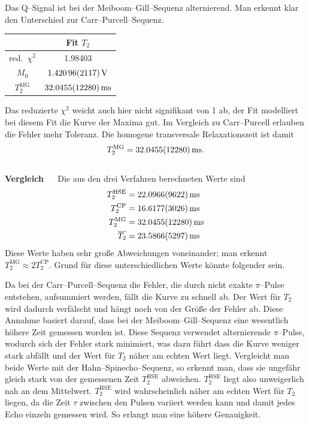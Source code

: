 \documentclass[10pt]{article}
\newenvironment{Figure}
  {\par\medskip\noindent\minipage{\linewidth}}
  {\endminipage\par\medskip}
\begin{document}
\begin{multicols}{2}
Das Q--Signal ist bei der Meiboom--Gill--Sequenz alternierend.
Man erkennt klar den Unterschied zur Carr--Purcell--Sequenz.
  \begin{Figure}
    \centering\resizebox{\textwidth}{!}{}
    \label{fig:mg}
  \end{Figure}
  \begin{center}
    \begin{tabular}{c|c}
    & Fit $T_2$\\
    \hline
    red.\ $\chi ^2$ &  1.98403\\
    $M_0$ & $\SI{1.42096+-0.02117}{V}$ \\
    $T_2^{\text{MG}}$ & $\SI{32.0455+-1.228}{ms}$ 
    \end{tabular}
  \label{Tab:mg_para}
  \end{center}
Das reduzierte $\chi ^2$ weicht auch hier nicht signifikant von 1 ab, der Fit modelliert bei diesem Fit die Kurve der Maxima gut.
Im Vergleich zu Carr--Purcell erlauben die Fehler mehr Toleranz.
Die homogene transversale Relaxationszeit ist damit
\begin{align} 
        T_2^{\text{MG}}=\SI{32.0455+-1.228}{ms}
.\end{align} 
\\\textbf{Vergleich} $\quad$ 
Die aus den drei Verfahren berechneten Werte sind
\begin{align} 
        T_2^{\text{HSE}}&=\SI{22.0966+-0.9622}{ms}\\
        T_2^{\text{CP}}&=\SI{16.6177+-0.3026}{ms}\\
        T_2^{\text{MG}}&=\SI{32.0455+-1.228}{ms}\\
        \overline{T_2}&=\SI{23.5866+-0.5297}{ms}
\end{align} 
Diese Werte haben sehr große Abweichungen voneinander; man erkennt $T_2^{\text{MG}}\approx 2T_2^{\text{CP}}$. Grund für diese unterschiedlichen Werte könnte folgender sein.

Da bei der Carr--Purcell--Sequenz die Fehler, die durch nicht exakte $\pi $--Pulse entstehen, aufsummiert werden, fällt die Kurve zu schnell ab.
Der Wert für $T_2$ wird dadurch verfälscht und hängt noch von der Größe der Fehler ab.
Diese Annahme basiert darauf, dass bei der Meiboom--Gill--Sequenz eine wesentlich höhere Zeit gemessen worden ist.
Diese Sequenz verwendet alternierende $\pi $--Pulse, wodurch sich der Fehler stark minimiert, was dazu führt dass die Kurve weniger stark abfällt und der Wert für $T_2$ näher am echten Wert liegt.
Vergleicht man beide Werte mit der Hahn--Spinecho--Sequenz, so erkennt man, dass sie ungefähr gleich stark von der gemessenen Zeit $T_2^{\text{HSE}}$ abweichen.
$T_2^{\text{HSE}}$ liegt also unweigerlich nah an dem Mittelwert.
$T_2^{\text{HSE}}$ wird wahrscheinlich näher am echten Wert für $T_2$ liegen, da die Zeit $\tau $ zwischen den Pulsen variiert werden kann und damit jedes Echo einzeln gemessen wird.
So erlangt man eine höhere Genauigkeit.


\end{multicols}
\end{document}
